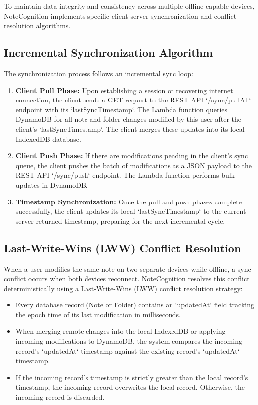 \documentclass[12pt, a4paper, oneside]{report}
\begin{document}
To maintain data integrity and consistency across multiple offline-capable devices, NoteCognition implements specific client-server synchronization and conflict resolution algorithms.

\subsection{Incremental Synchronization Algorithm}

The synchronization process follows an incremental sync loop:
\begin{enumerate}[noitemsep]
    \item \textbf{Client Pull Phase:} Upon establishing a session or recovering internet connection, the client sends a GET request to the REST API `/sync/pullAll` endpoint with its `lastSyncTimestamp`. The Lambda function queries DynamoDB for all note and folder changes modified by this user after the client's `lastSyncTimestamp`. The client merges these updates into its local IndexedDB database.
    \item \textbf{Client Push Phase:} If there are modifications pending in the client's sync queue, the client pushes the batch of modifications as a JSON payload to the REST API `/sync/push` endpoint. The Lambda function performs bulk updates in DynamoDB.
    \item \textbf{Timestamp Synchronization:} Once the pull and push phases complete successfully, the client updates its local `lastSyncTimestamp` to the current server-returned timestamp, preparing for the next incremental cycle.
\end{enumerate}

\subsection{Last-Write-Wins (LWW) Conflict Resolution}

When a user modifies the same note on two separate devices while offline, a sync conflict occurs when both devices reconnect. NoteCognition resolves this conflict deterministically using a Last-Write-Wins (LWW) conflict resolution strategy:
\begin{itemize}[noitemsep]
    \item Every database record (Note or Folder) contains an `updatedAt` field tracking the epoch time of its last modification in milliseconds.
    \item When merging remote changes into the local IndexedDB or applying incoming modifications to DynamoDB, the system compares the incoming record's `updatedAt` timestamp against the existing record's `updatedAt` timestamp.
    \item If the incoming record's timestamp is strictly greater than the local record's timestamp, the incoming record overwrites the local record. Otherwise, the incoming record is discarded.
\end{itemize}
\end{document}
